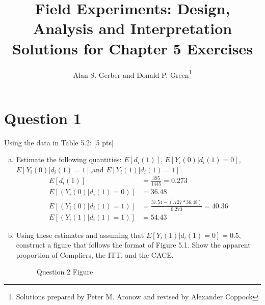 \documentclass[11pt,notitlepage]{article}\usepackage[]{graphicx}\usepackage[]{color}
\title{Field Experiments: Design, Analysis and Interpretation \\
Solutions for Chapter 5 Exercises}
\author{Alan S. Gerber and Donald P. Green\footnote{Solutions prepared by Peter M. Aronow and revised by Alexander Coppock}}
\date{\vspace{-5ex}}
\begin{document}
\maketitle

\section*{Question 1}
Using the data in Table 5.2: [5 pts]
\begin{enumerate}[a)]
\item Estimate the following quantities: $E[d_i(1)]$, $E[Y_i(0)|d_i(1) = 0]$, $E[Y_i(0)| d_i(1) = 1]$,and $E[Y_i(1)|d_i(1)=1]$.\\
\begin{align*}
E[d_i(1)] &= \frac{395}{1445} = 0.273\\
E[(Y_i(0)|d_i(1) = 0)] &= 36.48\\
E[(Y_i(0)|d_i(1) = 1)] &= \frac{37.54 - (.727*36.48)}{0.273} = 40.36\\
E[(Y_i(1)|d_i(1) = 1)] &= 54.43
\end{align*}

\item Using these estimates and assuming that $E[Y_i(1)|d_i(1) = 0] = 0.5$, construct a figure that follows the format of Figure 5.1. Show the apparent proportion of Compliers, the ITT, and the CACE.

\begin{figure}[H]
    \centering
        \caption{Question 2 Figure}
    \qquad
\end{figure}

\end{enumerate}
\end{document}

